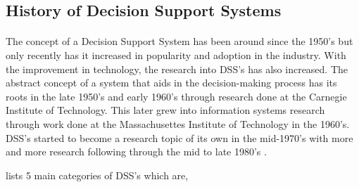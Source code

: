 \documentclass[12pt, oneside]{report}
\begin{document}
\subsection{History of Decision Support Systems}

\paragraph{ } The concept of a Decision Support System has been around since the 1950's but only recently has it increased in popularity and adoption in the industry. With the improvement in technology, the research into DSS's has also increased. The abstract concept of a system that aids in the decision-making process has its roots in the late 1950's and early 1960's through research done at the Carnegie Institute of Technology. This later grew into information systems research through work done at the Massachusettes Institute of Technology in the 1960's. DSS's started to become a research topic of its own in the mid-1970's with more and more research following through the mid to late 1980's \citep{Keen1980, Power2003}.

\citep{Power2003} lists 5 main categories of DSS's which are,
\end{document}
